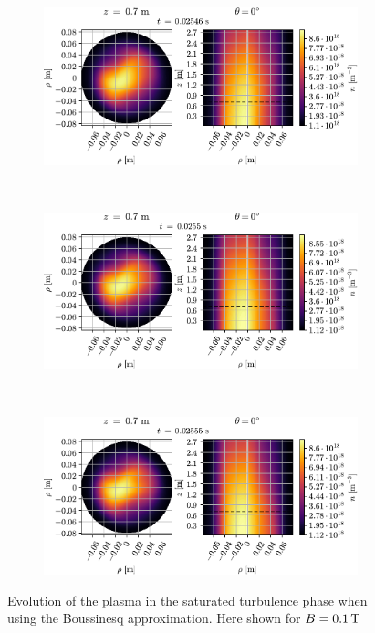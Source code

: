 {
\clearpage
\thispagestyle{empty}
\begin{figure}[htbp]
    \centering
    \begin{subfigure}[h]{1.00\textwidth}
        \centering
        \includegraphics{fig/results/compareBouss/evolution/n-perpPar-2D-0}
    \end{subfigure}%
    \\
    \begin{subfigure}[h]{1.00\textwidth}
        \centering
        \includegraphics{fig/results/compareBouss/evolution/n-perpPar-2D-1}
    \end{subfigure}
    \\
    \begin{subfigure}[h]{1.00\textwidth}
        \centering
        \includegraphics{fig/results/compareBouss/evolution/n-perpPar-2D-2}
    \end{subfigure}
    \caption{Evolution of the plasma in the saturated turbulence phase when using the Boussinesq approximation.
        Here shown for $B=0.1\, \text{T}$}
    \label{fig:turbBEv}
\end{figure}
\clearpage
}
%

